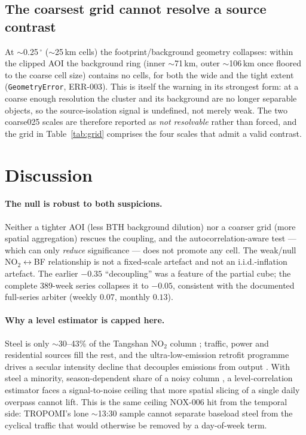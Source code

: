 \documentclass[11pt,a4paper]{article}
\providecommand{\degree}{\ensuremath{^{\circ}}}
\newcommand{\SI}[2]{#1\,#2}
\providecommand{\ce}[1]{\ensuremath{\mathrm{#1}}}
\begin{document}
\subsection{The coarsest grid cannot resolve a source contrast}
At $\sim$\SI{0.25}{\degree} ($\sim$\SI{25}{km} cells) the footprint/background geometry collapses:
within the clipped AOI the background ring (inner $\sim$\SI{71}{km}, outer $\sim$\SI{106}{km} once
floored to the coarse cell size) contains no cells, for both the wide and the tight extent
(\texttt{GeometryError}, ERR-003). This is itself the \citet{parubets_naito_2025} warning in its
strongest form: at a coarse enough resolution the cluster and its background are no longer
separable objects, so the source-isolation signal is undefined, not merely weak. The two
\textsf{coarse025} scales are therefore reported as \emph{not resolvable} rather than forced, and
the grid in Table~\ref{tab:grid} comprises the four scales that admit a valid contrast.

\section{Discussion}
\label{sec:discussion}

\paragraph{The null is robust to both suspicions.} Neither a tighter AOI (less BTH background
dilution) nor a coarser grid (more spatial aggregation) rescues the coupling, and the
autocorrelation-aware test --- which can only \emph{reduce} significance --- does not promote any
cell. The weak/null \ce{NO_2}$\leftrightarrow$BF relationship is not a fixed-scale artefact and not
an i.i.d.-inflation artefact. The earlier $-0.35$ ``decoupling'' was a feature of the partial cube;
the complete 389-week series collapses it to $-0.05$, consistent with the documented full-series
arbiter (weekly $0.07$, monthly $0.13$).

\paragraph{Why a level estimator is capped here.} Steel is only $\sim$30--43\% of the Tangshan
\ce{NO_2} column \citep{scirep_2024}; traffic, power and residential sources fill the rest, and the
ultra-low-emission retrofit programme drives a secular intensity decline that decouples emissions
from output \citep{li_2024_nox_trends}. With steel a minority, season-dependent share of a noisy
column \citep{montgomery_holloway_2018}, a level-correlation estimator faces a signal-to-noise
ceiling that more spatial slicing of a single daily overpass cannot lift. This is the same ceiling
NOX-006 hit from the temporal side: TROPOMI's lone $\sim$13:30 sample cannot separate baseload steel
from the cyclical traffic that would otherwise be removed by a day-of-week term.
\end{document}
